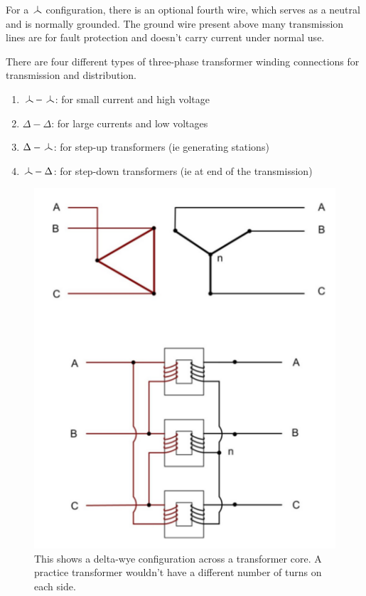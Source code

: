 For a $\wye$ configuration, there is an optional fourth wire, which serves as a neutral and is normally grounded. The ground wire present above many transmission lines are for fault protection and doesn't carry current under normal use.

There are four different types of three-phase transformer winding connections for transmission and distribution.
\begin{enumerate}
    \item $\wye - \wye$: for small current and high voltage
    \item $\Delta - \Delta$: for large currents and low voltages
    \item $\Delta - \wye$: for step-up transformers (ie generating stations)
    \item $\wye - \Delta$: for step-down transformers (ie at end of the transmission)
\end{enumerate}

\begin{figure}[H]
    \centering
    \includegraphics[scale=0.5]{figs/Delta-Wye_Transformer.png}
    \caption{This shows a delta-wye configuration across a transformer core. A practice transformer wouldn't have a different number of turns on each side.}
\end{figure}